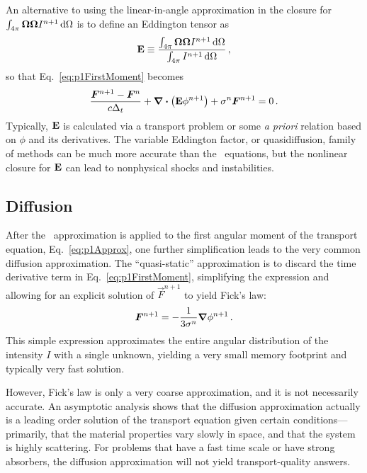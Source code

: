 An alternative to using the linear-in-angle approximation in the closure for
$\int_{4\pi} \bm{\Omega}\bm{\Omega} I^{n+1} \mathop{}\!\mathrm{d}\Omega$ is to define an
Eddington tensor \cite{Pom1982,Ols2000} as
\begin{equation*}
  \mathbf{E} \equiv \frac{\int_{4\pi} \bm{\Omega}\bm{\Omega} I^{n+1}
  \mathop{}\!\mathrm{d}\Omega}{\int_{4\pi} I^{n+1} \mathop{}\!\mathrm{d}\Omega}\,,
\end{equation*}
so that Eq.~\eqref{eq:p1FirstMoment} becomes
\begin{equation*}
  \frac{\bm{F}^{n+1} - \bm{F}^n }{c \Delta_t}
  + \bm{\nabla} \bm{\cdot} \left( \mathbf{E}\phi^{n+1} \right)
  + \sigma^n \bm{F}^{n+1}
  = 0\,.
\end{equation*}
Typically, $\mathbf{E}$ is calculated via a transport problem or some \emph{a
priori} relation based on $\phi$ and its derivatives.
The variable Eddington factor, or quasidiffusion, family of methods can be much
more accurate than the \Pone\ equations, but the nonlinear closure for $\mathbf{E}$
can lead to nonphysical shocks and instabilities.

\subsection{Diffusion}\label{sec:bgDiffusion}

After the \Pone\ approximation is applied to the first angular moment of the
transport equation, Eq.~\eqref{eq:p1Approx}, one further simplification leads to
the very common diffusion approximation. The ``quasi-static'' \cite{Dud1976}
approximation is to discard the time derivative term in
Eq.~\eqref{eq:p1FirstMoment}, simplifying the expression and allowing for an
explicit solution of $\vec{F}^{n+1}$ to yield Fick's law:
\begin{equation*}
  \bm{F}^{n+1} = - \frac{1}{3\sigma^n} \bm{\nabla} \phi^{n+1}\,.
\end{equation*}
This simple expression approximates the entire angular distribution of the
intensity $I$ with a single unknown, yielding a very small memory footprint and
typically very fast solution.

However, Fick's law is only a very coarse approximation, and it is not
necessarily accurate. An asymptotic analysis \cite{Lar1975,Lar1983a} shows that
the diffusion approximation actually is a leading
order solution of the transport equation given certain conditions---%
primarily, that the material properties vary slowly in space, and that the
system is highly scattering. For problems that have a fast time scale or have
strong absorbers, the diffusion approximation will not yield transport-quality
answers.

